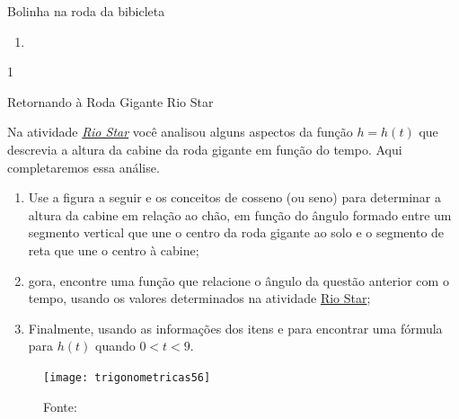 \begin{answer}{Bolinha na roda da bibicleta}
{\begin{enumerate}[left=0pt, wide]
\item \phantom{a}


\end{enumerate}
}{1}
\end{answer}
\label{trig-exp4}

\begin{task}{Retornando à Roda Gigante Rio Star}
\label{trig-ativ15}

Na atividade \hyperref[trig-ativ4]{\textit{Rio Star}}  você analisou alguns aspectos da função $h = h(t)$ que descrevia a altura da cabine da roda gigante em função do tempo. Aqui completaremos essa análise.
\begin{enumerate}
\item Use a figura a seguir e os conceitos de cosseno (ou seno) para determinar a altura da cabine em relação ao chão, em função do ângulo formado entre um segmento vertical que une o centro da roda gigante ao solo e o segmento de reta que une o centro à cabine;
\item gora, encontre uma função que relacione o ângulo da questão anterior com o tempo, usando os valores determinados na atividade \hyperref[trig-ativ4]{Rio Star};
\item Finalmente, usando as informações dos itens  e  para encontrar uma fórmula para $h(t)$ quando $0 < t < 9$.
\end{enumerate}

\begin{figure}[H]
\centering

\texttt{[image: trigonometricas56]}
\caption{Fonte: \cite{soares2010}}
\label{}
\end{figure}
\end{task}

